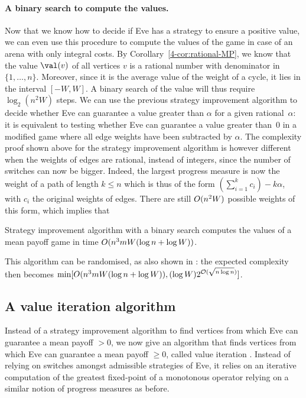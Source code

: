 \paragraph{A binary search to compute the values.}
Now that we know how to decide if Eve has a strategy to ensure a
positive value, we can even use this procedure to compute the values
of the game in case of an arena with only integral costs. By
Corollary~\ref{4-cor:rational-MP}, we know that the value $\val(v)$ of
all vertices $v$ is a rational number with denominator in
$\{1,\ldots,n\}$. Moreover, since it is the average value of the
weight of a cycle, it lies in the interval $[-W,W]$. A binary search
of the value will thus require $\log_2(n^2W)$ steps. We can use the
previous strategy improvement algorithm to decide whether Eve can
guarantee a value greater than $\alpha$ for a given rational~$\alpha$:
it is equivalent to testing whether Eve can guarantee a value greater
than~$0$ in a modified game where all edge weights have been
subtracted by $\alpha$. The complexity proof shown above for the
strategy improvement algorithm is however different when the weights
of edges are rational, instead of integers, since the number of
switches can now be bigger. Indeed, the largest progress measure is
now the weight of a path of length $k\leq n$ which is thus of the form
$(\sum_{i=1}^k c_i)-k\alpha$, with $c_i$ the original weights of
edges. There are still $O(n^2W)$ possible weights of this
form, which implies that
\begin{theorem}\label{4-thm:MP-strategy-improvement-binary-search}
  Strategy improvement algorithm with a binary search computes the
  values of a mean payoff game in time
  $O(n^3 mW(\log n+\log W))$.
\end{theorem}

This algorithm can be randomised, as also shown in
\cite{Bjorklund&Vorobyov:2007}: the expected complexity then becomes
$\min[O(n^3 mW(\log n+\log W)),(\log W) 2^{\mathcal
  O(\sqrt{n\log n})}]$.
  
  
\subsection*{A value iteration algorithm}
Instead of a strategy improvement algorithm to find vertices from
which Eve can guarantee a mean payoff $>0$, we now give an algorithm
that finds vertices from which Eve can guarantee a mean payoff
$\geq 0$, called value iteration
\cite{Brim&Chaloupka&Doyen&Gentilini&Raskin:2011}. Instead of relying
on switches amongst admissible strategies of Eve, it relies on an
iterative computation of the greatest fixed-point of a monotonous
operator relying on a similar notion of progress measures as before.

